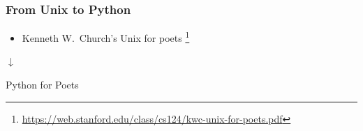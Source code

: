 \documentclass[xcolor=x11names,handout]{beamer}
\begin{document}
\begin{frame}
\frametitle{From Unix to Python}

\begin{itemize}
  \item Kenneth W.\ Church's \alert{Unix for poets}%
\footnote{\url{https://web.stanford.edu/class/cs124/kwc-unix-for-poets.pdf}}
\end{itemize}
\medskip            \pause

\centering

$\downarrow$
\medskip

\alert{Python for Poets}
\end{frame}
\end{document}
